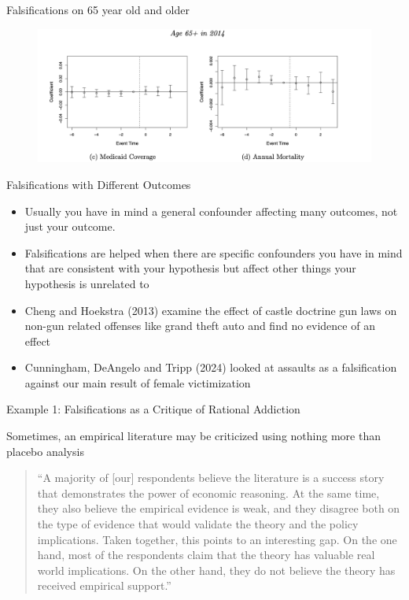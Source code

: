 \documentclass{beamer}
\begin{document}
\begin{frame}{Falsifications on 65 year old and older}

	\begin{figure}
\includegraphics[scale=0.425]{./lecture_includes/placebo_medicaid}
	\end{figure}

\end{frame}


\begin{frame}{Falsifications with Different Outcomes}
\begin{itemize}
	\item Usually you have in mind a general confounder affecting many outcomes, not just your outcome.
	\item Falsifications are helped when there are specific confounders you have in mind that are consistent with your hypothesis but affect other things your hypothesis is unrelated to
	\item Cheng and Hoekstra (2013) examine the effect of castle doctrine gun laws on non-gun related offenses like grand theft auto and find no evidence of an effect 
	\item Cunningham, DeAngelo and Tripp (2024) looked at assaults as a falsification against our main result of female victimization
	\end{itemize}
\end{frame}



\begin{frame}{Example 1: Falsifications as a Critique of Rational Addiction}


Sometimes, an empirical literature may be criticized using nothing more than placebo analysis

\begin{quote}``A majority of [our] respondents believe the literature is a success story that demonstrates the power of economic reasoning.  At the same time, they also believe the empirical evidence is weak, and they disagree both on the type of evidence that would validate the theory and the policy implications. Taken together, this points to an interesting gap.  On the one hand, most of the respondents claim that the theory has valuable real world implications.  On the other hand, they do not believe the theory has received empirical support.''
\end{quote}

\end{frame}
\end{document}
